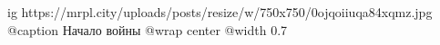  
 
 
 
 

\ifcmt
  ig https://mrpl.city/uploads/posts/resize/w/750x750/0ojqoiiuqa84xqmz.jpg
	@caption Начало войны
  @wrap center
  @width 0.7
\fi
